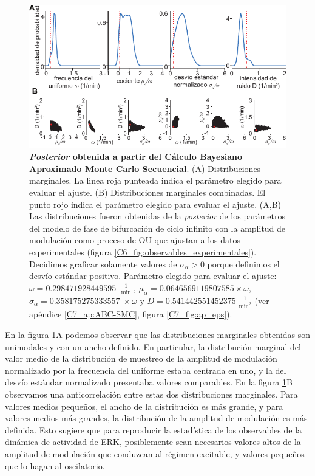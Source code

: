 \documentclass[./main.tex]{subfiles}
\begin{document}
\begin{figure}
    \centering
    \includegraphics[width=1\columnwidth]{figures/chapter7/C7_dist_fit.pdf} 
    \caption{\textbf{\textit{Posterior} obtenida a partir del Cálculo Bayesiano Aproximado Monte Carlo Secuencial}. (A) Distribuciones marginales. La linea roja punteada indica el parámetro elegido para evaluar el ajuste. (B) Distribuciones marginales combinadas. El punto rojo indica el parámetro elegido para evaluar el ajuste. (A,B) Las distribuciones fueron obtenidas de la \textit{posterior} de los parámetros del modelo de fase de bifurcación de ciclo infinito con la amplitud de modulación como proceso de OU que ajustan a los datos experimentales (figura \ref{C6_fig:observables_experimentales}). Decidimos graficar solamente valores de $\sigma_{\alpha}  > 0$ porque definimos el desvío estándar positivo. Parámetro elegido para evaluar el ajuste: $\omega = 0.298471928449595 \; \frac{1}{\text{ min }}$, $\mu_{\alpha} = 0.0646569119807585 \times \omega$, $ \sigma_{\alpha} = 0.358175275333557 \;  \times \omega $ y $D = 0.541442551452375 \; \frac{1}{\text{min}^{2}}$ (ver apéndice \ref{C7_ap:ABC-SMC}, figura \ref{C7_fig:ap_eps}).}
    \label{C7_fig:dist_fit}
\end{figure} 


En la figura \ref{C7_fig:dist_fit}A podemos observar que las distribuciones marginales obtenidas son unimodales y con un ancho definido. En particular, la distribución marginal del valor medio de la distribución de muestreo de la amplitud de modulación normalizado por la frecuencia del uniforme estaba centrada en uno, y la del desvío estándar normalizado presentaba valores comparables. En la figura \ref{C7_fig:dist_fit}B observamos una anticorrelación entre estas dos distribuciones marginales. Para valores medios pequeños, el ancho de la distribución es más grande, y para valores medios más grandes, la distribución de la amplitud de modulación es más definida. Esto sugiere que para reproducir la estadística de los observables de la dinámica de actividad de ERK, posiblemente sean necesarios valores altos de la amplitud de modulación que conduzcan al régimen excitable, y valores pequeños que lo hagan al oscilatorio.  
\end{document}

